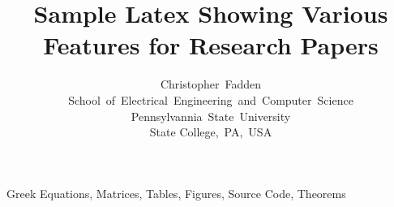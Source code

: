 \documentclass[journal]{IEEEtran}
\begin{document}
\title{Sample Latex Showing Various Features for Research Papers}

\author{Christopher~Fadden \\
        School~of~Electrical~Engineering~and~Computer~Science \\
        Pennsylvannia~State~University \\
        State College,~PA,~USA}

\maketitle


\begin{IEEEkeywords}
  Greek Equations, Matrices, Tables, Figures, Source Code, Theorems
\end{IEEEkeywords}








\end{document}
